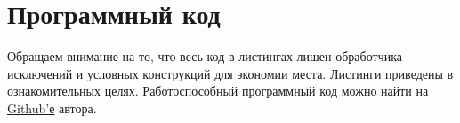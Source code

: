 \documentclass[a4paper,14pt]{extarticle}
\begin{document}
\section{Программный код}
\label{sec:code}
Обращаем внимание на то, что весь код в листингах лишен обработчика исключений
и условных конструкций  для экономии места. Листинги приведены в ознакомительных
целях. Работоспособный программный код можно найти на
\href{https://github.com/kannab98/diplom/}{Github'е} автора.




\end{document}
